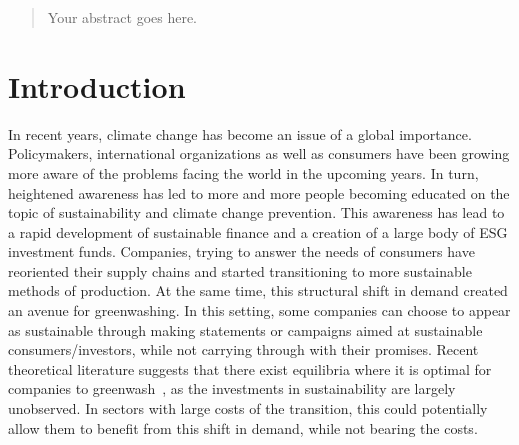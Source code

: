 \documentclass[12pt]{article}
\author{Your Name}
\date{Date of submission: \today}
\begin{document}

\pagebreak

\begin{abstract}
Your abstract goes here.


\end{abstract}
\pagebreak

\tableofcontents
\pagebreak
\listoffigures
\listoftables
\pagebreak

\section{Introduction}\label{sect:introduction}

In recent years, climate change has become an issue of a global importance. Policymakers, international 
organizations as well as consumers have been growing more aware of the problems facing the world in the upcoming years. In turn, heightened awareness has led to more and more people becoming educated on the topic of sustainability and climate change prevention. This awareness has lead to a rapid development of sustainable finance and a creation of a large body of ESG investment funds. Companies, trying to answer the needs of consumers have reoriented their supply chains and started transitioning to more sustainable methods of production. At the same time, this structural shift in demand created an avenue for greenwashing. In this setting, some companies can choose to appear as sustainable through making statements or campaigns aimed at sustainable consumers/investors, while not carrying through with their promises. Recent theoretical literature suggests that there exist equilibria where it is optimal for companies to greenwash~\parencite{wu_bad_2020, cartellierCanInvestorsCurb2023}, as the investments in sustainability are largely unobserved. In sectors with large costs of the transition, this could potentially allow them to benefit from this shift in demand, while not bearing the costs. 
\end{document}
